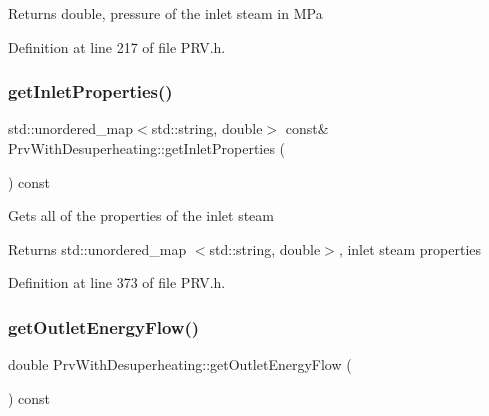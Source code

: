 \begin{DoxyReturn}{Returns}
double, pressure of the inlet steam in M\+Pa 
\end{DoxyReturn}


Definition at line 217 of file P\+R\+V.\+h.

\mbox{\label{class_prv_with_desuperheating_a62f0d3bb1064d1c59970b9b939cbc35a}} 
\subsubsection{\texorpdfstring{get\+Inlet\+Properties()}{getInletProperties()}}
{\footnotesize\ttfamily std\+::unordered\+\_\+map$<$std\+::string, double$>$ const\& Prv\+With\+Desuperheating\+::get\+Inlet\+Properties (\begin{DoxyParamCaption}{ }\end{DoxyParamCaption}) const\hspace{0.3cm}{\ttfamily [inline]}}

Gets all of the properties of the inlet steam \begin{DoxyReturn}{Returns}
std\+::unordered\+\_\+map $<$std\+::string, double$>$, inlet steam properties 
\end{DoxyReturn}


Definition at line 373 of file P\+R\+V.\+h.

\mbox{\label{class_prv_with_desuperheating_aa6e9bbb28c565ba8f7770f69ace33ab3}} 
\subsubsection{\texorpdfstring{get\+Outlet\+Energy\+Flow()}{getOutletEnergyFlow()}}
{\footnotesize\ttfamily double Prv\+With\+Desuperheating\+::get\+Outlet\+Energy\+Flow (\begin{DoxyParamCaption}{ }\end{DoxyParamCaption}) const\hspace{0.3cm}{\ttfamily [inline]}}

